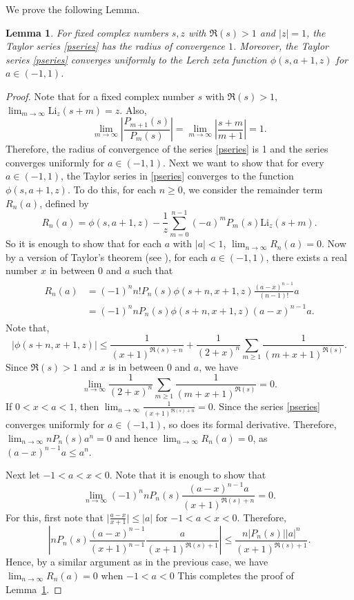 \documentclass[12pt]{amsart}
\newtheorem{lem}{Lemma}
\newcommand{\lemref}[1]{Lemma~\ref{#1}}
\begin{document}
We prove the following Lemma.
\begin{lem}\label{T-series}
For fixed complex numbers $s,z$ with $\Re(s)>1$ and $|z|=1$, the Taylor series \eqref{pseries} has the radius of convergence $1$.
Moreover, the Taylor series \eqref{pseries} converges uniformly to the Lerch zeta function $\phi(s,a+1,z)$ for $a \in (-1,1)$.
\end{lem}
\begin{proof}
Note that for a fixed complex number $s$ with $\Re(s)>1$, $\displaystyle\lim_{m\rightarrow \infty}\mathrm{Li}_z(s+m)=z$.
Also,
$$
\lim_{m\rightarrow \infty}\left\lvert\frac{P_{m+1}(s)}{P_{m}(s)}\right\rvert=\lim_{m\rightarrow \infty}\left\lvert\frac{s+m}{m+1}\right\rvert=1.
$$
Therefore, the radius of convergence of the series \eqref{pseries} is 1 and the series converges uniformly for $a \in (-1,1)$.
Next we want to show that for every $a \in (-1,1)$, the Taylor series in \eqref{pseries} converges to the function $\phi(s,a+1,z)$.
To do this, for each $n\geq 0$, we consider the remainder term $R_n(a)$, defined by
$$
R_n(a)=\phi(s,a+1,z)-\frac{1}{z}\sum_{m=0}^{n-1}(-a)^mP_m(s)\mathrm{Li}_z(s+m).
$$
So it is enough to show that for each $a$ with $|a|<1$, $\lim_{n\rightarrow\infty}R_n(a)=0$. Now by a
version of Taylor's theorem (see \cite[Corollary 31.6]{KAR}), for each $a\in(-1,1)$, there exists a real number $x$ in between 0 and $a$ such that 
\begin{align}\label{remainder}
\begin{split}
R_n(a)&=(-1)^nn!P_n(s){\phi(s+n,x+1,z)}\frac{(a-x)^{n-1}}{(n-1)!}a\\
&=(-1)^nnP_n(s){\phi(s+n,x+1,z)}(a-x)^{n-1}a.
\end{split}
\end{align}
Note that,
$$
|\phi(s+n,x+1,z)|\leq\frac{1}{(x+1)^{\Re(s)+n}}+\frac{1}{(2+x)^n}\sum_{m\ge 1}\frac{1}{(m+x+1)^{\Re(s)}}.
$$
Since $\Re(s)>1$ and $x$ is in between 0 and $a$, we have
$$
\lim_{n\rightarrow\infty}\frac{1}{(2+x)^n}\sum_{m\ge 1}\frac{1}{(m+x+1)^{\Re(s)}}=0.
$$
If $0<x<a<1$, then $\lim_{n\rightarrow\infty}\frac{1}{(x+1)^{\Re(s)+n}}=0$. Since the series \eqref{pseries} converges uniformly
for $a \in (-1,1)$, so does its formal derivative.
Therefore, $\lim_{n\rightarrow\infty}nP_n(s)a^n=0$ and hence $\lim_{n\rightarrow\infty}R_n(a)=0$, as $(a-x)^{n-1}a\leq a^n$.


Next let $-1<a<x<0.$ Note that it is enough to show that
$$
\lim_{n\rightarrow\infty}(-1)^nnP_n(s)\frac{(a-x)^{n-1}a}{(x+1)^{\Re(s)+n}}=0.
$$
For this, first note that $\lvert\frac{a-x}{x+1}\rvert\leq|a|$ for $-1<a<x<0$.  Therefore,
$$
\left| nP_n(s)\frac{(a-x)^{n-1}}{(x+1)^{n-1}}\frac{a}{(x+1)^{\Re(s)+1}}\right|\leq \frac{n|P_n(s)||a|^{n}}{(x+1)^{\Re(s)+1}}.
$$
Hence, by a similar argument as in the previous case, we have $\lim_{n\rightarrow\infty}R_n(a)=0$ when $-1<a<0$
This completes the proof of \lemref{T-series}.
\end{proof}
\end{document}
